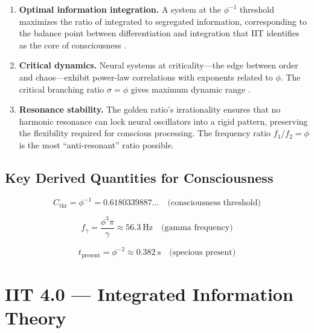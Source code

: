 \documentclass[12pt,a4paper]{article}
\begin{document}
\begin{enumerate}[leftmargin=2em]
  \item \textbf{Optimal information integration.} A system at the $\phi^{-1}$
    threshold maximizes the ratio of integrated to segregated information,
    corresponding to the balance point between differentiation and integration
    that IIT identifies as the core of consciousness \cite{Albantakis2023}.

  \item \textbf{Critical dynamics.} Neural systems at criticality---the edge
    between order and chaos---exhibit power-law correlations with exponents
    related to $\phi$. The critical branching ratio $\sigma = \phi$ gives
    maximum dynamic range \cite{Friston2010}.

  \item \textbf{Resonance stability.} The golden ratio's irrationality ensures
    that no harmonic resonance can lock neural oscillators into a rigid
    pattern, preserving the flexibility required for conscious processing.
    The frequency ratio $f_1/f_2 = \phi$ is the most ``anti-resonant'' ratio
    possible.
\end{enumerate}

\subsection{Key Derived Quantities for Consciousness}

\begin{equation}
C_{\mathrm{thr}} = \phi^{-1} = 0.6180339887\ldots \quad \text{(consciousness threshold)}
\label{eq:threshold}
\end{equation}

\begin{equation}
f_\gamma = \frac{\phi^3 \pi}{\gamma} \approx 56.3~\text{Hz} \quad \text{(gamma frequency)}
\label{eq:fgamma}
\end{equation}

\begin{equation}
t_{\mathrm{present}} = \phi^{-2} \approx 0.382~\text{s} \quad \text{(specious present)}
\label{eq:specious}
\end{equation}

\section{IIT 4.0 --- Integrated Information Theory}
\label{sec:iit}
\end{document}
